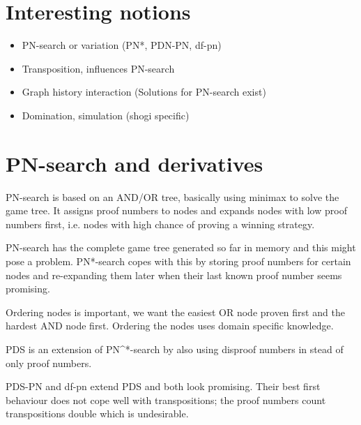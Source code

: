 \documentclass{article}
\begin{document}
\section{Interesting notions}
\begin{itemize}
\item PN-search or variation (PN*, PDN-PN, df-pn)
\item Transposition, influences PN-search
\item Graph history interaction (Solutions for PN-search exist)
\item Domination, simulation (shogi specific)

\end{itemize}

\section{PN-search and derivatives}
PN-search is based on an AND/OR tree, basically using minimax to solve the game tree. It assigns proof numbers to nodes and expands nodes with low proof numbers first, i.e. nodes with high chance of proving a winning strategy.

PN-search has the complete game tree generated so far in memory and this might pose a problem. PN*-search copes with this by storing proof numbers for certain nodes and re-expanding them later when their last known proof number seems promising.

Ordering nodes is important, we want the easiest OR node proven first and the hardest AND node first. Ordering the nodes uses domain specific knowledge.

PDS is an extension of PN^*-search by also using disproof numbers in stead of only proof numbers.

PDS-PN and df-pn extend PDS and both look promising. Their best first behaviour does not cope well with transpositions; the proof numbers count transpositions double which is undesirable.
\end{document}
